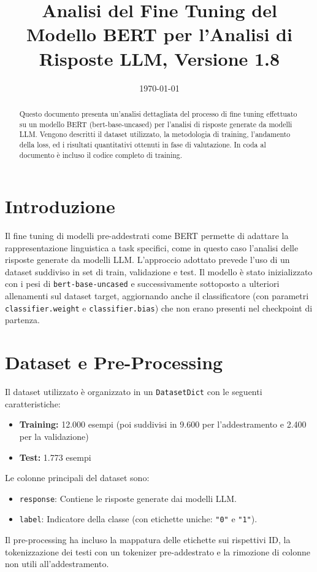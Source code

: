 \documentclass[11pt,a4paper]{article}
\title{Analisi del Fine Tuning del Modello BERT per l'Analisi di Risposte LLM, Versione 1.8}
\author{}
\date{\today}
\begin{document}
\maketitle

\begin{abstract}
Questo documento presenta un'analisi dettagliata del processo di fine tuning effettuato su un modello BERT (bert-base-uncased) per l'analisi di risposte generate da modelli LLM. Vengono descritti il dataset utilizzato, la metodologia di training, l'andamento della loss, ed i risultati quantitativi ottenuti in fase di valutazione. In coda al documento è incluso il codice completo di training.
\end{abstract}

\section{Introduzione}
Il fine tuning di modelli pre-addestrati come BERT permette di adattare la rappresentazione linguistica a task specifici, come in questo caso l'analisi delle risposte generate da modelli LLM. L'approccio adottato prevede l'uso di un dataset suddiviso in set di train, validazione e test. Il modello è stato inizializzato con i pesi di \texttt{bert-base-uncased} e successivamente sottoposto a ulteriori allenamenti sul dataset target, aggiornando anche il classificatore (con parametri \texttt{classifier.weight} e \texttt{classifier.bias}) che non erano presenti nel checkpoint di partenza.

\section{Dataset e Pre-Processing}
Il dataset utilizzato è organizzato in un \texttt{DatasetDict} con le seguenti caratteristiche:
\begin{itemize}
    \item \textbf{Training:} 12.000 esempi (poi suddivisi in 9.600 per l'addestramento e 2.400 per la validazione)
    \item \textbf{Test:} 1.773 esempi
\end{itemize}
Le colonne principali del dataset sono:
\begin{itemize}
    \item \texttt{response}: Contiene le risposte generate dai modelli LLM.
    \item \texttt{label}: Indicatore della classe (con etichette uniche: \texttt{"0"} e \texttt{"1"}).
\end{itemize}
Il pre-processing ha incluso la mappatura delle etichette sui rispettivi ID, la tokenizzazione dei testi con un tokenizer pre-addestrato e la rimozione di colonne non utili all'addestramento.
\end{document}
